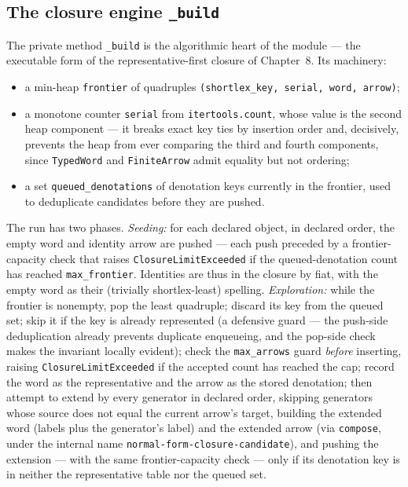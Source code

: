 \subsection{The closure engine \texttt{\_build}}\label{ch09:sec:build}

The private method \texttt{\_build} is the algorithmic heart of the module
--- the executable form of the representative-first closure of Chapter~8.
Its machinery:

\begin{itemize}
\item a min-heap \texttt{frontier} of quadruples
      \texttt{(shortlex\_key, serial, word, arrow)};
\item a monotone counter \texttt{serial} from \texttt{itertools.count},
      whose value is the second heap component --- it breaks exact key
      ties by insertion order and, decisively, prevents the heap from ever
      comparing the third and fourth components, since \texttt{TypedWord}
      and \texttt{FiniteArrow} admit equality but not ordering;
\item a set \texttt{queued\_denotations} of denotation keys currently in
      the frontier, used to deduplicate candidates before they are pushed.
\end{itemize}

The run has two phases. \emph{Seeding:} for each declared object, in
declared order, the empty word and identity arrow are pushed --- each push
preceded by a frontier-capacity check that raises
\texttt{ClosureLimitExceeded} if the queued-denotation count has reached
\texttt{max\_frontier}. Identities are thus in the closure by fiat, with
the empty word as their (trivially shortlex-least) spelling.
\emph{Exploration:} while the frontier is nonempty, pop the least
quadruple; discard its key from the queued set; skip it if the key is
already represented (a defensive guard --- the push-side deduplication
already prevents duplicate enqueueing, and the pop-side check makes the
invariant locally evident); check the \texttt{max\_arrows} guard
\emph{before} inserting, raising \texttt{ClosureLimitExceeded} if the
accepted count has reached the cap; record the word as the representative
and the arrow as the stored denotation; then attempt to extend by every
generator in declared order, skipping generators whose source does not
equal the current arrow's target, building the extended word (labels plus
the generator's label) and the extended arrow (via \texttt{compose}, under
the internal name \texttt{normal-form-closure-candidate}), and pushing the
extension --- with the same frontier-capacity check --- only if its
denotation key is in neither the representative table nor the queued set.

